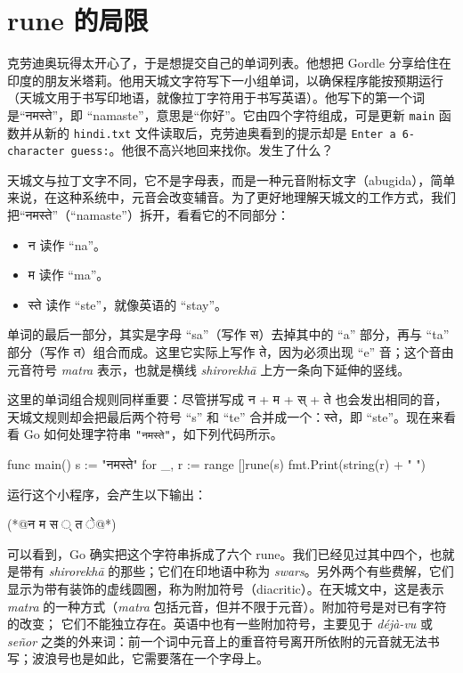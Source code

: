 \section{rune 的局限}

克劳迪奥玩得太开心了，于是想提交自己的单词列表。他想把 Gordle 分享给住在印度的朋友米塔莉。他用天城文字符写下一小组单词，以确保程序能按预期运行（天城文用于书写印地语，就像拉丁字符用于书写英语）。他写下的第一个词是“नमस्ते”，即 ``namaste''，意思是“你好”。它由四个字符组成，可是更新 \texttt{main} 函数并从新的 \texttt{hindi.txt} 文件读取后，克劳迪奥看到的提示却是 \texttt{Enter a 6-character guess:}。他很不高兴地回来找你。发生了什么？

天城文与拉丁文字不同，它不是字母表，而是一种元音附标文字（abugida），简单来说，在这种系统中，元音会改变辅音。为了更好地理解天城文的工作方式，我们把“नमस्ते”（``namaste''）拆开，看看它的不同部分：

\begin{itemize}
\item न 读作 ``na''。
\item म 读作 ``ma''。
\item स्ते 读作 ``ste''，就像英语的 ``stay''。
\end{itemize}

单词的最后一部分，其实是字母 ``sa''（写作 स）去掉其中的 ``a'' 部分，再与 ``ta'' 部分（写作 त）组合而成。这里它实际上写作 ते，因为必须出现 ``e'' 音；这个音由元音符号 \emph{matra} 表示，也就是横线 \emph{shirorekhā} 上方一条向下延伸的竖线。

这里的单词组合规则同样重要：尽管拼写成 न + म + स् + ते 也会发出相同的音，天城文规则却会把最后两个符号 ``s'' 和 ``te'' 合并成一个：स्ते，即 ``ste''。现在来看看 Go 如何处理字符串 \texttt{"नमस्ते"}，如下列代码所示。

\begin{gocode}[title={代码清单 5.40 理解 \texttt{नमस्ते} 这个案例}]
func main() {
    s := "नमस्ते"
    for _, r := range []rune(s) {
        fmt.Print(string(r) + " ")
    }
}
\end{gocode}

运行这个小程序，会产生以下输出：

\begin{shellcode}[]
(*@{\PocketDevanagariFont न म स ् त े}@*)
\end{shellcode}

可以看到，Go 确实把这个字符串拆成了六个 rune。我们已经见过其中四个，也就是带有 \emph{shirorekhā} 的那些；它们在印地语中称为 \emph{swars}。另外两个有些费解，它们显示为带有装饰的虚线圆圈，称为附加符号（diacritic）。在天城文中，这是表示 \emph{matra} 的一种方式（\emph{matra} 包括元音，但并不限于元音）。附加符号是对已有字符的改变；
它们不能独立存在。英语中也有一些附加符号，主要见于 \emph{déjà-vu} 或 \emph{señor} 之类的外来词：前一个词中元音上的重音符号离开所依附的元音就无法书写；波浪号也是如此，它需要落在一个字母上。

